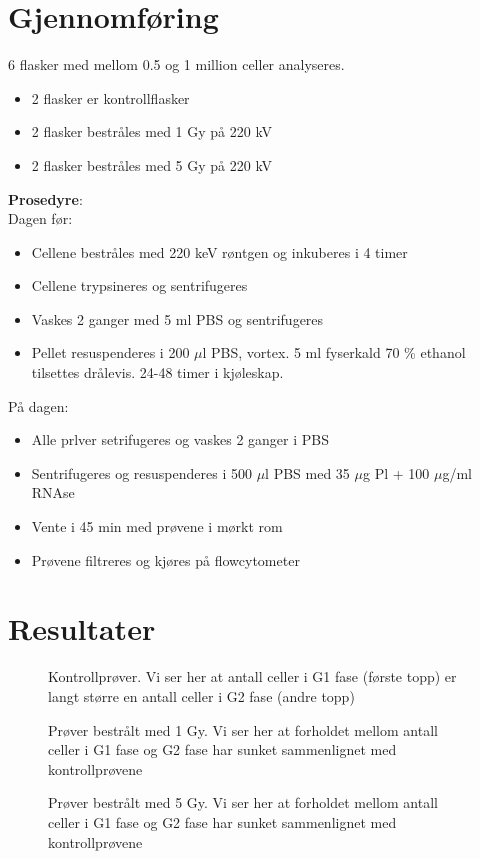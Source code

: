 \documentclass[a4paper, 12pt]{article}
\newcommand{\vertfig}[2][]{%
  \begin{minipage}{.5\textwidth}
  \centering
  \subfloat[#1]{\texttt{[image: \#2]}}
  \end{minipage}}
\begin{document}
\section{Gjennomføring}
6 flasker med mellom 0.5 og 1 million celler analyseres. 
\begin{itemize}
\item 2 flasker er kontrollflasker
\item 2 flasker bestråles med 1 Gy på 220 kV
\item 2 flasker bestråles med 5 Gy på 220 kV
\end{itemize} 
\textbf{Prosedyre}:\\
Dagen før:
\begin{itemize}
\item Cellene bestråles med 220 keV røntgen og inkuberes i 4 timer
\item Cellene trypsineres og sentrifugeres
\item Vaskes 2 ganger med 5 ml PBS og sentrifugeres
\item Pellet resuspenderes i 200 $\mu$l PBS, vortex. 5 ml fyserkald 70 \% ethanol tilsettes drålevis. 24-48 timer i kjøleskap.
\end{itemize}
På dagen:
\begin{itemize}
\item Alle prlver setrifugeres og vaskes 2 ganger i PBS
\item Sentrifugeres og resuspenderes i 500 $\mu$l PBS med 35 $\mu$g Pl + 100 $\mu$g/ml RNAse
\item Vente i 45 min med prøvene i mørkt rom
\item Prøvene filtreres og kjøres på flowcytometer
\end{itemize}
\section{Resultater}

\begin{figure}[H]
\vertfig[Kontroll 1]{/Users/Tuv/Documents/UiO/H17/FYS3710/Cellelab/Results/kontroll-1.png}
\vertfig[Kontroll 2]{/Users/Tuv/Documents/UiO/H17/FYS3710/Cellelab/Results/kontroll-2.png}
\caption{Kontrollprøver. Vi ser her at antall celler i G1 fase (første topp) er langt større en antall celler i G2 fase (andre topp)}
\end{figure}
\begin{figure}[H]
\vertfig[1Grey 1]{/Users/Tuv/Documents/UiO/H17/FYS3710/Cellelab/Results/1grey-1.png}
\vertfig[1Grey 2]{/Users/Tuv/Documents/UiO/H17/FYS3710/Cellelab/Results/1grey-2.png}
\caption{Prøver bestrålt med 1 Gy. Vi ser her at forholdet mellom antall celler i G1 fase og G2 fase har sunket sammenlignet med kontrollprøvene}
\end{figure}
\begin{figure}[H]
\vertfig[5 Grey 1]{/Users/Tuv/Documents/UiO/H17/FYS3710/Cellelab/Results/5grey-1.png}
\vertfig[5 Grey 2]{/Users/Tuv/Documents/UiO/H17/FYS3710/Cellelab/Results/5grey-2.png}
\caption{Prøver bestrålt med 5 Gy. Vi ser her at forholdet mellom antall celler i G1 fase og G2 fase har sunket sammenlignet med kontrollprøvene}
\end{figure}
\end{document}
